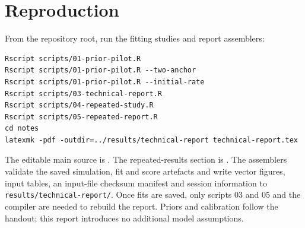 \documentclass[11pt,a4paper]{article}
\begin{document}
\section*{Reproduction}
From the repository root, run the fitting studies and report assemblers:
\begin{verbatim}
Rscript scripts/01-prior-pilot.R
Rscript scripts/01-prior-pilot.R --two-anchor
Rscript scripts/01-prior-pilot.R --initial-rate
Rscript scripts/03-technical-report.R
Rscript scripts/04-repeated-study.R
Rscript scripts/05-repeated-report.R
cd notes
latexmk -pdf -outdir=../results/technical-report technical-report.tex
\end{verbatim}
The editable main source is .
The repeated-results section is .
The assemblers validate the saved simulation, fit and score artefacts and write vector
figures, input tables, an input-file checksum manifest and session
information to \texttt{results/technical-report/}. Once fits are saved,
only scripts 03 and 05 and the compiler are needed to rebuild the report.
Priors and calibration follow the handout;
this report introduces no additional model assumptions.

\printbibliography
\end{document}

